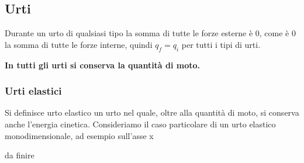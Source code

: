     \subsection{Urti}
    \par Durante un urto di qualsiasi tipo la somma di tutte le forze esterne è 0, come è 0 la somma di tutte le forze interne, quindi $q_f=q_i$ per tutti i tipi di urti.
    \par\textbf{In tutti gli urti si conserva la quantità di moto.}
    \subsubsection{Urti elastici}
    \par Si definisce urto elastico un urto nel quale, oltre alla quantità di moto, si conserva anche l'energia cinetica. Consideriamo il caso particolare di un urto elastico monodimensionale, ad esempio sull'asse x
    \par da finire